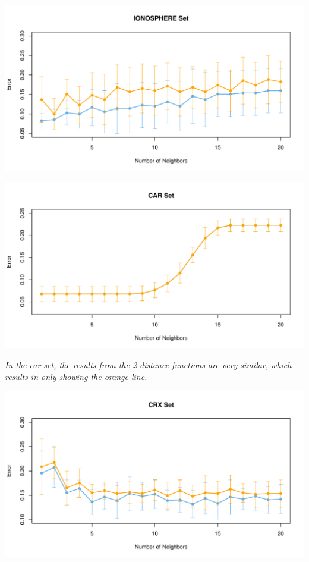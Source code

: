\documentclass{article}
\begin{document}
\begin{center}
    \includegraphics[width=1\linewidth]{Images/Prob2/Prob2-2-Prelim-Iono.pdf}
    \bigskip
    
    \includegraphics[width=1\linewidth]{Images/Prob2/Prob2-2-Prelim-Car.pdf}
    
    \parbox{5in}{\textit{In the car set, the results from the 2 distance functions are very similar, which results in only showing the orange line.}}\bigskip
    
    \includegraphics[width=1\linewidth]{Images/Prob2/Prob2-2-Prelim-Crx.pdf}
\end{center}
\bigskip 
\end{document}

